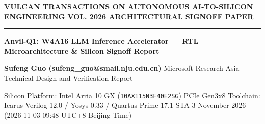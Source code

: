 \documentclass[11pt,a4paper]{article}
\begin{document}
{\scriptsize\sffamily\textcolor{vulcan}{\textbf{VULCAN TRANSACTIONS ON AUTONOMOUS AI-TO-SILICON ENGINEERING \hfill VOL. 2026 \textperiodcentered{} ARCHITECTURAL SIGNOFF PAPER}}\par}

\vspace{1pt}\textcolor{vulcan}{\rule{\textwidth}{1.2pt}}\vspace{4pt}

\begin{center}

{\sffamily\LARGE\bfseries Anvil-Q1: W4A16 LLM Inference Accelerator — RTL Microarchitecture \& Silicon Signoff Report\par}\vspace{3pt}

{\small\sffamily\textbf{Sufeng Guo (\allowbreak{}sufeng\_\allowbreak{}guo@smail.nju.edu.cn)\allowbreak{}} \textperiodcentered{} Microsoft Research Asia \textperiodcentered{} Technical Design and Verification Report\par}\vspace{1pt}

{\scriptsize\sffamily\textcolor{black!75}{Silicon Platform: Intel Arria 10 GX (\texttt{10AX115N3F40E2SG}) PCIe Gen3x8 \textperiodcentered{} Toolchain: Icarus Verilog 12.0 / Yosys 0.33 / Quartus Prime 17.1 STA \textperiodcentered{} 3 November 2026 (\allowbreak{}2026-11-03 09:48 UTC+\allowbreak{}8 Beijing Time)\allowbreak{}}\par}

\end{center}\vspace{2pt}
\end{document}

